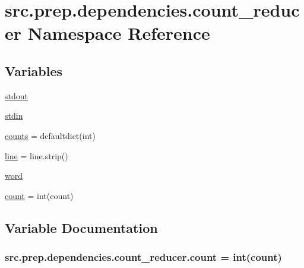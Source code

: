 \hypertarget{namespacesrc_1_1prep_1_1dependencies_1_1count__reducer}{}\section{src.\+prep.\+dependencies.\+count\+\_\+reducer Namespace Reference}
\label{namespacesrc_1_1prep_1_1dependencies_1_1count__reducer}
\subsection*{Variables}
\begin{DoxyCompactItemize}
\item 
\hyperlink{namespacesrc_1_1prep_1_1dependencies_1_1count__reducer_a1fa1419e06626ee5d8a2bb58c8882ea6}{stdout}
\item 
\hyperlink{namespacesrc_1_1prep_1_1dependencies_1_1count__reducer_a516e1b362d84a65925e480fb5011e713}{stdin}
\item 
\hyperlink{namespacesrc_1_1prep_1_1dependencies_1_1count__reducer_a8163addac064cd8cee504794f421b236}{counts} = defaultdict(int)
\item 
\hyperlink{namespacesrc_1_1prep_1_1dependencies_1_1count__reducer_a456eabd5e7dc3307afe78d4096d96c96}{line} = line.\+strip()
\item 
\hyperlink{namespacesrc_1_1prep_1_1dependencies_1_1count__reducer_a7943ccfc3c9edebe663b72d8476bc907}{word}
\item 
\hyperlink{namespacesrc_1_1prep_1_1dependencies_1_1count__reducer_aa8b61197a7957bb990544efded214b04}{count} = int(count)
\end{DoxyCompactItemize}


\subsection{Variable Documentation}
\subsubsection[{\texorpdfstring{count}{count}}]{\setlength{\rightskip}{0pt plus 5cm}src.\+prep.\+dependencies.\+count\+\_\+reducer.\+count = int(count)}\hypertarget{namespacesrc_1_1prep_1_1dependencies_1_1count__reducer_aa8b61197a7957bb990544efded214b04}{}\label{namespacesrc_1_1prep_1_1dependencies_1_1count__reducer_aa8b61197a7957bb990544efded214b04}
